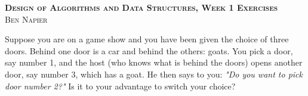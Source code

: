 \documentclass[a4paper, answers]{exam}
\begin{document}
\begin{center}
	\textbf{\textsc{Design of Algorithms and Data Structures, Week 1 Exercises}}
	\\
	\textsc{Ben Napier}
	\vspace{1em}
\end{center}

\begin{questions}
	\question

	\question Suppose you are on a game show and you have been given the choice
	of three doors.
	Behind one door is a car and behind the others: goats.
	You pick a door, say number 1, and the host (who knows what is behind the
	doors) opens another door, say number 3, which has a goat.
	He then says to you: \emph{"Do you want to pick door number 2?"}
	Is it to your advantage to switch your choice?
\end{questions}
\end{document}
